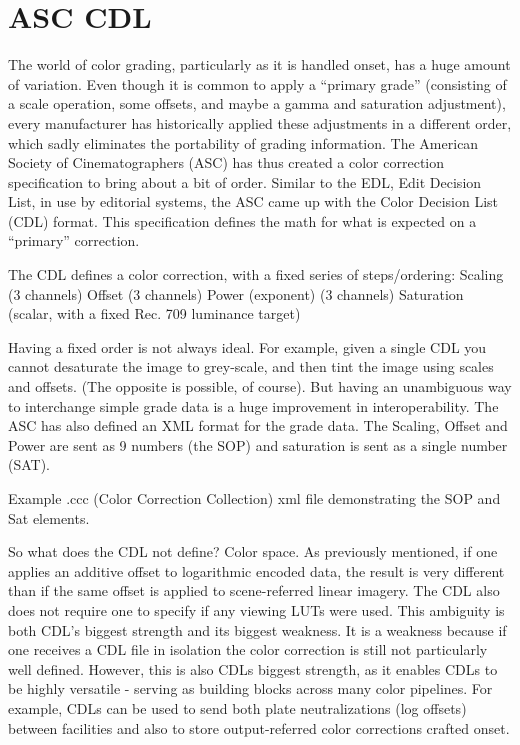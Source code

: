 \section{ASC CDL}%
\label{sec:asc-cdl}

The world of color grading, particularly as it is handled onset, has a huge amount of variation. Even though it is common to apply a “primary grade” (consisting of a scale operation, some offsets, and maybe a gamma and saturation adjustment), every manufacturer has historically applied these adjustments in a different order, which sadly eliminates the portability of grading information. The American Society of Cinematographers (ASC) has thus created a color correction specification to bring about a bit of order. Similar to the EDL, Edit Decision List, in use by editorial systems, the ASC came up with the Color Decision List (CDL) format. This specification defines the math for what is expected on a “primary” correction.

The CDL defines a color correction, with a fixed series of steps/ordering:
 Scaling (3 channels)
 Offset (3 channels)
 Power (exponent) (3 channels)
 Saturation (scalar, with a fixed Rec. 709 luminance target)

Having a fixed order is not always ideal. For example, given a single CDL you cannot desaturate the image to grey-scale, and then tint the image using scales and offsets. (The opposite is possible, of course). But having an unambiguous way to interchange simple grade data is a huge improvement in interoperability. The ASC has also defined an XML format for the grade data. The Scaling, Offset and Power are sent as 9 numbers (the SOP) and saturation is sent as a single number (SAT).


Example .ccc (Color Correction Collection) xml file demonstrating the SOP and Sat elements.

So what does the CDL not define? Color space. As previously mentioned, if one applies an additive offset to logarithmic encoded data, the result is very different than if the same offset is applied to scene-referred linear imagery. The CDL also does not require one to specify if any viewing LUTs were used. This ambiguity is both CDL’s biggest strength and its biggest weakness. It is a weakness because if one receives a CDL file in isolation the color correction is still not particularly well defined. However, this is also CDLs biggest strength, as it enables CDLs to be highly versatile - serving as building blocks across many color pipelines. For example, CDLs can be used to send both plate neutralizations (log offsets) between facilities and also to store output-referred color corrections crafted onset.

